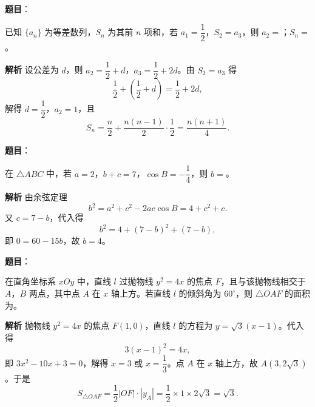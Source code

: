 \begin{answer}

\textbf{题目}：

已知 $\{a_n\}$ 为等差数列，$S_n$ 为其前 $n$ 项和，若 $a_1=\dfrac12$，$S_2=a_3$，则 $a_2=$\gkblank{}；$S_n=$\gkblank{}。

\textbf{解析}
设公差为 $d$，则 $a_2=\dfrac12+d$，$a_3=\dfrac12+2d$。由 $S_2=a_3$ 得
\nopagebreak[4]
\[\frac12+\left(\frac12+d\right)=\frac12+2d,\]
解得 $d=\dfrac12$，$a_2=1$，且
\nopagebreak[4]
\[S_n=\frac n2+\frac{n(n-1)}2\cdot\frac12=\frac{n(n+1)}4.\]


\end{answer}
\begin{answer}

\textbf{题目}：

在 $\triangle ABC$ 中，若 $a=2$，$b+c=7$，$\cos B=-\dfrac14$，则 $b=$\gkblank{}。

\textbf{解析}
由余弦定理
\nopagebreak[4]
\[b^2=a^2+c^2-2ac\cos B=4+c^2+c.\]
又 $c=7-b$，代入得
\nopagebreak[4]
\[b^2=4+(7-b)^2+(7-b),\]
即 $0=60-15b$，故 $b=4$。


\end{answer}
\begin{answer}

\textbf{题目}：

在直角坐标系 $xOy$ 中，直线 $l$ 过抛物线 $y^2=4x$ 的焦点 $F$，且与该抛物线相交于 $A$，$B$ 两点，其中点 $A$ 在 $x$ 轴上方。若直线 $l$ 的倾斜角为 $60^\circ$，则 $\triangle OAF$ 的面积为\gkblank{}。

\textbf{解析}
抛物线 $y^2=4x$ 的焦点 $F(1,0)$，直线 $l$ 的方程为 $y=\sqrt3(x-1)$。代入得
\nopagebreak[4]
\[3(x-1)^2=4x,\]
即 $3x^2-10x+3=0$，解得 $x=3$ 或 $x=\dfrac13$。点 $A$ 在 $x$ 轴上方，故 $A(3,2\sqrt3)$。于是
\nopagebreak[4]
\[S_{\triangle OAF}=\frac12|OF|\cdot|y_A|=\frac12\times1\times2\sqrt3=\sqrt3.\]


\end{answer}
